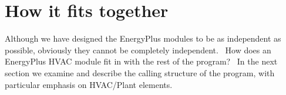 \section{How it fits together}\label{how-it-fits-together}

Although we have designed the EnergyPlus modules to be as independent as possible, obviously they cannot be completely independent.~ How does an EnergyPlus HVAC module fit in with the rest of the program?~ In the next section we examine and describe the calling structure of the program, with particular emphasis on HVAC/Plant elements.
